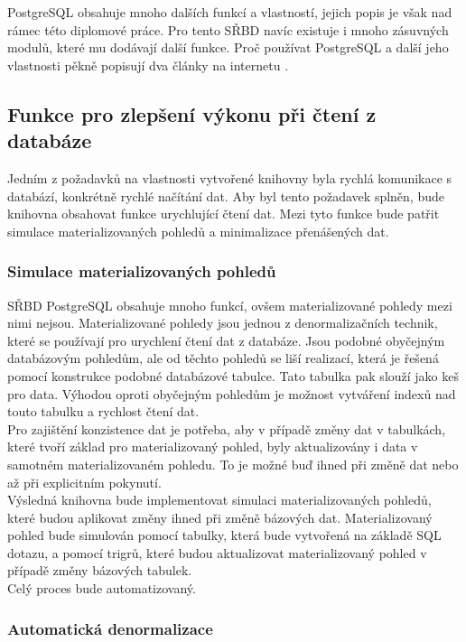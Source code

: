 \documentclass[ing,male,java,dept456]{diploma}						%
\begin{document}
PostgreSQL obsahuje mnoho dalších funkcí a vlastností, jejich popis je však nad rámec této diplomové práce. Pro tento SŘBD navíc existuje i mnoho zásuvných modulů, které mu dodávají další funkce. Proč používat PostgreSQL a další jeho vlastnosti pěkně popisují dva články na internetu \cite{postgre, postgre2}.

\subsection{Funkce pro zlepšení výkonu při čtení z databáze}

Jedním z požadavků na vlastnosti vytvořené knihovny byla rychlá komunikace s databází, konkrétně rychlé načítání dat. Aby byl tento požadavek splněn, bude knihovna obsahovat funkce urychlující čtení dat. Mezi tyto funkce bude patřit simulace materializovaných pohledů a minimalizace přenášených dat.

\subsubsection{Simulace materializovaných pohledů}

SŘBD PostgreSQL obsahuje mnoho funkcí, ovšem materializované pohledy mezi nimi nejsou. Materializované pohledy jsou jednou z denormalizačních technik, které se používají pro urychlení čtení dat z databáze. Jsou podobné obyčejným databázovým pohledům, ale od těchto pohledů se liší realizací, která je řešená pomocí konstrukce podobné databázové tabulce. Tato tabulka pak slouží jako keš pro data. Výhodou oproti obyčejným pohledům je možnost vytváření indexů nad touto tabulku a rychlost čtení dat. \\
Pro zajištění konzistence dat je potřeba, aby v případě změny dat v tabulkách, které tvoří základ pro materializovaný pohled, byly aktualizovány i data v samotném materializovaném pohledu. To je možné buď ihned při změně dat nebo až při explicitním pokynutí. \\

Výsledná knihovna bude implementovat simulaci materializovaných pohledů, které budou aplikovat změny ihned při změně bázových dat. Materializovaný pohled bude simulován pomocí tabulky, která bude vytvořená na základě SQL dotazu, a pomocí trigrů, které budou aktualizovat materializovaný pohled v případě změny bázových tabulek. \\

Celý proces bude automatizovaný. 

\subsubsection{Automatická denormalizace}
\end{document}

